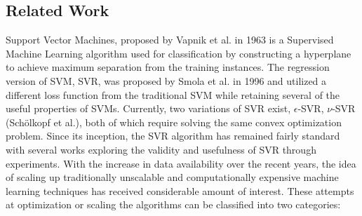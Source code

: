 \documentclass[12pt]{article}
\begin{document}
\subsection{Related Work}
Support Vector Machines, proposed by Vapnik et al. in 1963 is a Supervised Machine Learning algorithm used for classification by constructing a hyperplane to achieve maximum separation from the training instances. The regression version of SVM, SVR, was proposed by Smola et al. in 1996 and utilized a different loss function from the traditional SVM while retaining several of the useful properties of SVMs.
\newline\newline
Currently, two variations of SVR exist, $\epsilon$-SVR, $\nu$-SVR (Sch\"olkopf et al.), both of which require solving the same convex optimization problem. 
Since its inception, the SVR algorithm has remained fairly standard with several works exploring the validity and usefulness of SVR through experiments.
\newline\newline
With the increase in data availability over the recent years, the idea of scaling up traditionally unscalable and computationally expensive machine learning techniques has received considerable amount of interest. 
\newline\newline
These attempts at optimization or scaling the algorithms can be classified into two categories:
\end{document}
